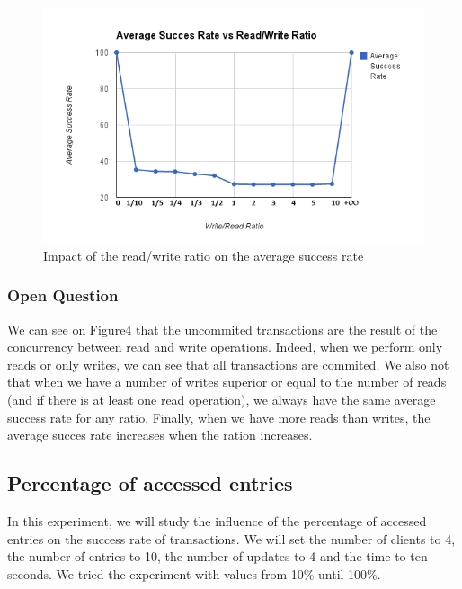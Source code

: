 \documentclass[a4paper, 11pt]{article}
\begin{document}
\begin{figure}[H]
\begin{center}
\includegraphics[scale=0.5]{exp4.png}
\caption{Impact of the read/write ratio on the average success rate}
\end{center}
\end{figure}

\subsubsection{Open Question}
We can see on Figure4 that the uncommited transactions are the result of the concurrency between read and write operations. Indeed, when we perform only reads or only writes, we can see that all transactions are commited. We also not that when we have a number of writes superior or equal to the number of reads (and if there is at least one read operation), we always have the same average success rate for any ratio. Finally, when we have more reads than writes, the average succes rate increases when the ration increases.

\subsection{Percentage of accessed entries}
In this experiment, we will study the influence of the percentage of accessed entries on the success rate of transactions. We will set the number of clients to 4, the number of entries to 10, the number of updates to 4 and the time to ten seconds. We tried the experiment with values from 10\% until 100\%.
\end{document}
